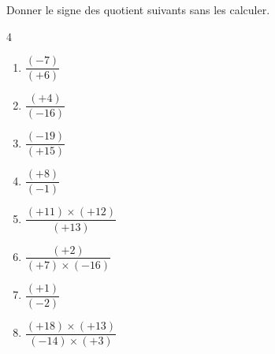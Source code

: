 \begin{exercice*}
    Donner le signe des quotient suivants sans les calculer.
    \begin{multicols}4
      \begin{spacing}{2}
        \begin{enumerate}
            \item $ \dfrac{(-7)}{(+6)} $            
            \item $ \dfrac{(+4)}{(-16)} $            
            \item $ \dfrac{(-19)}{(+15)} $
            \item $ \dfrac{(+8)}{(-1)} $     
            \item $ \dfrac{(+11) \times (+12)}{(+13)} $
	    	    \item $ \dfrac{(+2)}{(+7) \times (-16)} $
	    	    \item $ \dfrac{(+1)}{(-2)} $
	    	    \item $ \dfrac{(+18) \times (+13)}{(-14) \times (+3)} $	
        \end{enumerate}
      \end{spacing}
    \end{multicols}
      
\end{exercice*}
